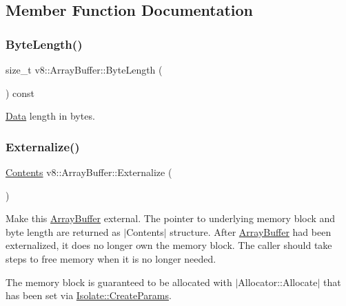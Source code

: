 \subsection{Member Function Documentation}
\mbox{\label{classv8_1_1ArrayBuffer_af4c4ad8075f74892ed3fa217219a2626}} 
\subsubsection{\texorpdfstring{Byte\+Length()}{ByteLength()}}
{\footnotesize\ttfamily size\+\_\+t v8\+::\+Array\+Buffer\+::\+Byte\+Length (\begin{DoxyParamCaption}{ }\end{DoxyParamCaption}) const}

\mbox{\hyperlink{classv8_1_1Data}{Data}} length in bytes. \mbox{\label{classv8_1_1ArrayBuffer_a8b90b72486cfacb4fbec157f4803f889}} 
\subsubsection{\texorpdfstring{Externalize()}{Externalize()}}
{\footnotesize\ttfamily \mbox{\hyperlink{classv8_1_1ArrayBuffer_1_1Contents}{Contents}} v8\+::\+Array\+Buffer\+::\+Externalize (\begin{DoxyParamCaption}{ }\end{DoxyParamCaption})}

Make this \mbox{\hyperlink{classv8_1_1ArrayBuffer}{Array\+Buffer}} external. The pointer to underlying memory block and byte length are returned as $\vert$\+Contents$\vert$ structure. After \mbox{\hyperlink{classv8_1_1ArrayBuffer}{Array\+Buffer}} had been externalized, it does no longer own the memory block. The caller should take steps to free memory when it is no longer needed.

The memory block is guaranteed to be allocated with $\vert$\+Allocator\+::\+Allocate$\vert$ that has been set via \mbox{\hyperlink{structv8_1_1Isolate_1_1CreateParams}{Isolate\+::\+Create\+Params}}. \mbox{\label{classv8_1_1ArrayBuffer_ae44291df12ca35de9b519e7372aa640a}} 
